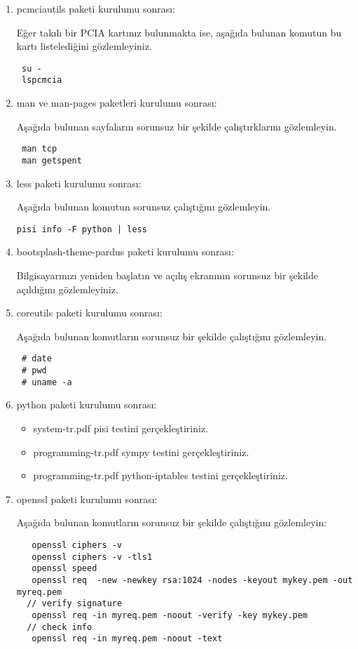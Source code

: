 \documentclass[a4paper,10pt]{article}
\begin{document}
\begin{enumerate}
\item pcmciautils paketi kurulumu sonrası:

Eğer takılı bir PCIA kartınız bulunmakta ise, aşağıda bulunan komutun bu kartı listelediğini gözlemleyiniz.
\begin{verbatim}
 su -
 lspcmcia
\end{verbatim}



\item man ve man-pages paketleri kurulumu sonrası:

Aşağıda bulunan sayfaların sorunsuz bir şekilde çalıştırklarını gözlemleyin.
\begin{verbatim}
 man tcp
 man getspent
\end{verbatim}


\item less paketi kurulumu sonrası:

Aşağıda bulunan komutun sorunsuz çalıştığını gözlemleyin.
\begin{verbatim}
pisi info -F python | less 
\end{verbatim}


\item bootsplash-theme-pardus paketi kurulumu sonrası:

Bilgisayarınızı yeniden başlatın ve açılış ekranının sorunsuz bir şekilde açıldığını gözlemleyiniz.

\item coreutils paketi kurulumu sonrası:

Aşağıda bulunan komutların sorunsuz bir şekilde çalıştığını gözlemleyin.
\begin{verbatim}
 # date
 # pwd
 # uname -a
\end{verbatim}


\item python paketi kurulumu sonrası:
\begin{itemize}
 \item system-tr.pdf pisi testini gerçekleştiriniz.
 \item programming-tr.pdf sympy testini gerçekleştiriniz.
 \item programming-tr.pdf python-iptables testini gerçekleştiriniz.
\end{itemize}


\item openssl paketi kurulumu sonrası:

Aşağıda bulunan komutların sorunsuz bir şekilde çalıştığını gözlemleyin:
\begin{verbatim}
   openssl ciphers -v 
   openssl ciphers -v -tls1
   openssl speed
   openssl req  -new -newkey rsa:1024 -nodes -keyout mykey.pem -out myreq.pem
  // verify signature
   openssl req -in myreq.pem -noout -verify -key mykey.pem
  // check info
   openssl req -in myreq.pem -noout -text


\end{verbatim}
\end{enumerate}
\end{document}
